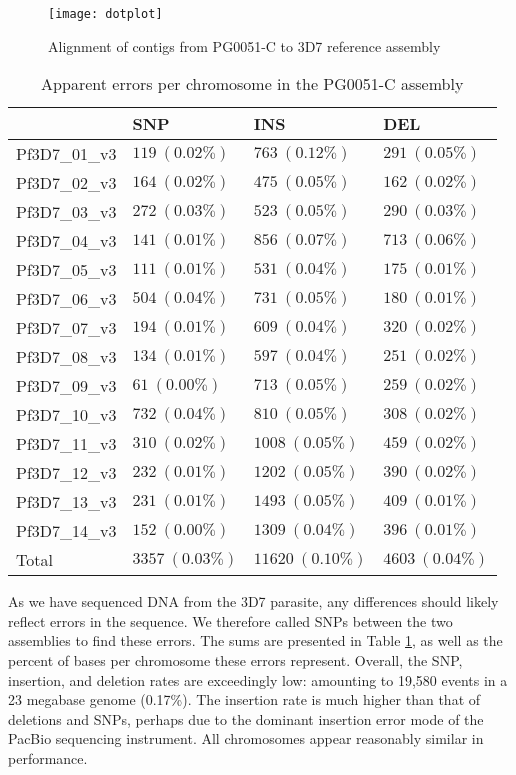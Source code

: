 \begin{figure}[h!]
  \centering
    \texttt{[image: dotplot]}
  \caption{Alignment of contigs from PG0051-C to 3D7 reference assembly}
  \label{fig:dotplot3D7}
\end{figure}

\begin{table}[]
\centering
\caption{Apparent errors per chromosome in the PG0051-C assembly}
\label{tbl:asmerrors}
\begin{tabular}{@{}llll@{}}
\toprule
              & SNP             & INS              & DEL            \\
\midrule
Pf3D7\_01\_v3 & $119~(0.02\%)$  & $763~(0.12\%)$   & $291~(0.05\%)$ \\
Pf3D7\_02\_v3 & $164~(0.02\%)$  & $475~(0.05\%)$   & $162~(0.02\%)$ \\
Pf3D7\_03\_v3 & $272~(0.03\%)$  & $523~(0.05\%)$   & $290~(0.03\%)$ \\
Pf3D7\_04\_v3 & $141~(0.01\%)$  & $856~(0.07\%)$   & $713~(0.06\%)$ \\
Pf3D7\_05\_v3 & $111~(0.01\%)$  & $531~(0.04\%)$   & $175~(0.01\%)$ \\
Pf3D7\_06\_v3 & $504~(0.04\%)$  & $731~(0.05\%)$   & $180~(0.01\%)$ \\
Pf3D7\_07\_v3 & $194~(0.01\%)$  & $609~(0.04\%)$   & $320~(0.02\%)$ \\
Pf3D7\_08\_v3 & $134~(0.01\%)$  & $597~(0.04\%)$   & $251~(0.02\%)$ \\
Pf3D7\_09\_v3 & $61~(0.00\%)$   & $713~(0.05\%)$   & $259~(0.02\%)$ \\
Pf3D7\_10\_v3 & $732~(0.04\%)$  & $810~(0.05\%)$   & $308~(0.02\%)$ \\
Pf3D7\_11\_v3 & $310~(0.02\%)$  & $1008~(0.05\%)$  & $459~(0.02\%)$ \\
Pf3D7\_12\_v3 & $232~(0.01\%)$  & $1202~(0.05\%)$  & $390~(0.02\%)$ \\
Pf3D7\_13\_v3 & $231~(0.01\%)$  & $1493~(0.05\%)$  & $409~(0.01\%)$ \\
Pf3D7\_14\_v3 & $152~(0.00\%)$  & $1309~(0.04\%)$  & $396~(0.01\%)$ \\
Total         & $3357~(0.03\%)$ & $11620~(0.10\%)$ & $4603~(0.04\%)$ \\
\bottomrule
\end{tabular}
\end{table}

As we have sequenced DNA from the 3D7 parasite, any differences should likely reflect errors in the sequence. We therefore called SNPs between the two assemblies to find these errors. The sums are presented in Table \ref{tbl:asmerrors}, as well as the percent of bases per chromosome these errors represent.  Overall, the SNP, insertion, and deletion rates are exceedingly low: amounting to 19,580 events in a 23 megabase genome (0.17\%). The insertion rate is much higher than that of deletions and SNPs, perhaps due to the dominant insertion error mode of the PacBio sequencing instrument. All chromosomes appear reasonably similar in performance.

